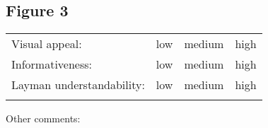 \documentclass[10pt]{article}
\theoremstyle{definition}
\begin{document}
\subsection*{Figure 3}

\def\arraystretch{1.5}
\begin{tabular}{lccc}
    Visual appeal: & low & medium & high \\
    Informativeness: & low & medium & high \\
    Layman understandability: & low & medium & high \\
    \hspace{2in} &
    \hspace{1in} &
    \hspace{1in} &
    \hspace{1in}
\end{tabular}

\noindent
Other comments:
\vspace{1.5in}
\end{document}
